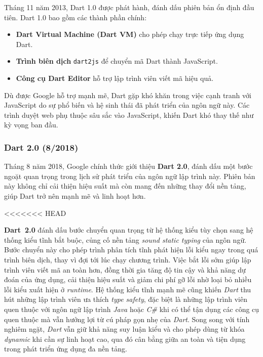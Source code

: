 \documentclass[../DoAn.tex]{subfiles}
\numberwithin{figure}{chapter}
\begin{document}
Tháng 11 năm 2013, Dart 1.0 được phát hành, đánh dấu phiên bản ổn định đầu tiên. Dart 1.0 bao gồm các thành phần chính:

\begin{itemize}
    \item \textbf{Dart Virtual Machine (Dart VM)} cho phép chạy trực tiếp ứng dụng Dart.
    \item \textbf{Trình biên dịch} \texttt{dart2js} để chuyển mã Dart thành JavaScript.
    \item \textbf{Công cụ Dart Editor} hỗ trợ lập trình viên viết mã hiệu quả.
\end{itemize}

Dù được Google hỗ trợ mạnh mẽ, Dart gặp khó khăn trong việc cạnh tranh với JavaScript do sự phổ biến và hệ sinh thái đã phát triển của ngôn ngữ này. Các trình duyệt web phụ thuộc sâu sắc vào JavaScript, khiến Dart khó thay thế như kỳ vọng ban đầu.

\subsubsection{Dart 2.0 (8/2018)}

Tháng 8 năm 2018, Google chính thức giới thiệu \textbf{Dart 2.0}, đánh dấu một bước ngoặt quan trọng trong lịch sử phát triển của ngôn ngữ lập trình này. Phiên bản này không chỉ cải thiện hiệu suất mà còn mang đến những thay đổi nền tảng, giúp Dart trở nên mạnh mẽ và linh hoạt hơn.

<<<<<<< HEAD
    
\textbf{Dart~2.0} đánh dấu bước chuyển quan trọng từ hệ thống kiểu tùy chọn sang hệ thống kiểu tĩnh bắt buộc, củng cố nền tảng \textit{sound static typing} của ngôn ngữ. Bước chuyển này cho phép trình phân tích tĩnh phát hiện lỗi kiểu ngay trong quá trình biên dịch, thay vì đợi tới lúc chạy chương trình. Việc bắt lỗi sớm giúp lập trình viên viết mã an toàn hơn, đồng thời gia tăng độ tin cậy và khả năng dự đoán của ứng dụng, cải thiện hiệu suất và giảm chi phí gỡ lỗi nhờ loại bỏ nhiều lỗi kiểu xuất hiện ở \textit{runtime}. Hệ thống kiểu tĩnh mạnh mẽ cũng khiến \textit{Dart} thu hút những lập trình viên ưa thích \textit{type safety}, đặc biệt là những lập trình viên quen thuộc với ngôn ngữ lập trình \textit{Java} hoặc \textit{C\#} khi có thể tận dụng các công cụ quen thuộc mà vẫn hưởng lợi từ cú pháp gọn nhẹ của \textit{Dart}. Song song với tính nghiêm ngặt, \textit{Dart} vẫn giữ khả năng suy luận kiểu và cho phép dùng từ khóa \textit{dynamic} khi cần sự linh hoạt cao, qua đó cân bằng giữa an toàn và tiện dụng trong phát triển ứng dụng đa nền tảng.
\end{document}
